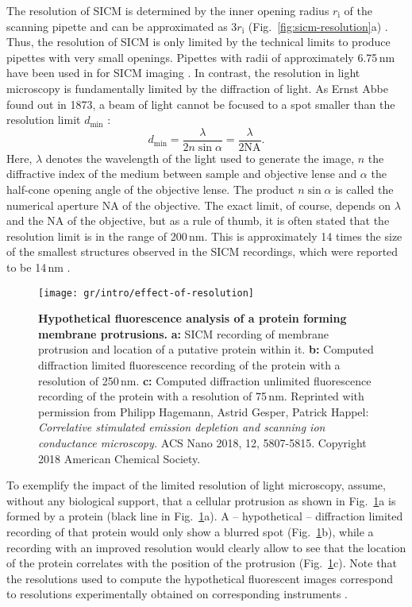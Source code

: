 The resolution of SICM is determined by the inner opening radius
$r_\mathrm{i}$ of the scanning pipette and can be approximated as
$3r_\mathrm{i}$ (Fig.~\ref{fig:sicm-resolution}a)
\cite{rheinlaender:094905,Rheinlaender2015}.  Thus, the resolution of SICM is
only limited by the technical limits to produce pipettes with very small
openings. Pipettes with radii of approximately 6.75\,nm have been used in for
SICM imaging \cite{Shevchuk2006}. In
contrast, the resolution in light microscopy is fundamentally limited by the
diffraction of light. As Ernst Abbe found out in 1873, a beam of light cannot
be focused to a spot smaller than the resolution limit $d_\text{min}$
\cite{Abbe1873}:
\begin{equation}
  d_\text{min} = \frac\lambda{2n\sin\alpha} = \frac\lambda{2\mathrm{NA}}\text{.}
  \label{eq:diffraction-limit}
\end{equation}
Here, $\lambda$ denotes the wavelength of the light used to generate the
image, $n$ the diffractive index of the medium between sample and objective
lense and $\alpha$ the half-cone opening angle of the objective lense. The
product $n\sin\alpha$ is called the numerical aperture $\mathrm{NA}$ of the
objective. The exact limit, of course, depends on $\lambda$ and the NA of the
objective, but as a rule of thumb, it is often stated that the resolution
limit is in the range of 200\,nm. This is approximately 14 times the size of
the smallest structures observed in the SICM recordings, which were reported to be 14\,nm
\cite{Shevchuk2006}.

\begin{figure}
  \centering
  \texttt{[image: gr/intro/effect-of-resolution]}%
  \caption{\textbf{Hypothetical fluorescence analysis of a protein forming
      membrane protrusions.} \textbf{a:} SICM recording of membrane protrusion
    and location of a putative protein within it. \textbf{b:} Computed
    diffraction limited fluorescence recording of the protein with a
    resolution of 250\,nm. \textbf{c:} Computed diffraction unlimited
    fluorescence recording of the protein with a resolution of 75\,nm.
    Reprinted with permission from Philipp Hagemann, Astrid Gesper, Patrick
    Happel: \emph{Correlative stimulated emission depletion and scanning ion
      conductance microscopy.} ACS Nano 2018, 12, 5807-5815. Copyright 2018
    American Chemical Society.}
  \label{fig:sicm-and-light-resolution}
\end{figure}

To exemplify the impact of the limited resolution of light microscopy, assume,
without any biological support, that a cellular protrusion as shown in
Fig.~\ref{fig:sicm-and-light-resolution}a is formed by a protein (black line
in Fig.~\ref{fig:sicm-and-light-resolution}a). A -- hypothetical --
diffraction limited recording of that protein would only show a blurred spot
(Fig.~\ref{fig:sicm-and-light-resolution}b), while a recording with an
improved resolution would clearly allow to see that the location of the
protein correlates with the position of the protrusion
(Fig.~\ref{fig:sicm-and-light-resolution}c). Note that the resolutions used to
compute the hypothetical fluorescent images correspond to resolutions
experimentally obtained on corresponding instruments \cite{Hagemann2018}. 

